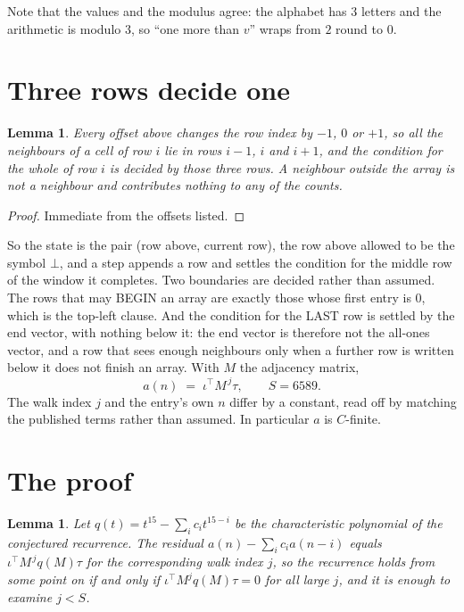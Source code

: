 \documentclass[11pt,a4paper]{article}
\theoremstyle{plain}
\newtheorem{lemma}[theorem]{Lemma}
\theoremstyle{definition}
\begin{document}
Note that the values and the modulus agree: the alphabet has $3$ letters and the arithmetic
is modulo $3$, so ``one more than $v$'' wraps from $2$ round to $0$.

\section{Three rows decide one}

\begin{lemma}\label{lem:win}
Every offset above changes the row index by $-1$, $0$ or $+1$, so all the neighbours of a cell
of row $i$ lie in rows $i-1$, $i$ and $i+1$, and the condition for the whole of row $i$ is
decided by those three rows. A neighbour outside the array is not a neighbour and contributes
nothing to any of the counts.
\end{lemma}

\begin{proof}
Immediate from the offsets listed.
\end{proof}

So the state is the pair (row above, current row), the row above allowed to be the symbol
$\bot$, and a step appends a row and settles the condition for the middle row of the window it
completes. Two boundaries are decided rather than assumed. The rows that may BEGIN an array are
exactly those whose first entry is $0$, which is the top-left clause. And the condition for the
LAST row is settled by the end vector, with nothing below it: the end vector is therefore not
the all-ones vector, and a row that sees enough neighbours only when a further row is written
below it does not finish an array. With $M$ the adjacency matrix,
\[
a(n)\;=\;\iota^{\!\top}M^{\,j}\tau ,\qquad S=6589.
\]
The walk index $j$ and the entry's own $n$ differ by a constant, read off by matching the
published terms rather than assumed. In particular $a$ is $C$-finite.

\section{The proof}

\begin{lemma}\label{lem:crit}
Let $q(t)=t^{15}-\sum_i c_it^{15-i}$ be the characteristic polynomial of the
conjectured recurrence. The residual $a(n)-\sum_ic_ia(n-i)$ equals
$\iota^{\!\top}M^{\,j}q(M)\tau$ for the corresponding walk index $j$, so the recurrence
holds from some point on if and only if $\iota^{\!\top}M^{j}q(M)\tau=0$ for all large $j$,
and it is enough to examine $j<S$.
\end{lemma}
\end{document}
